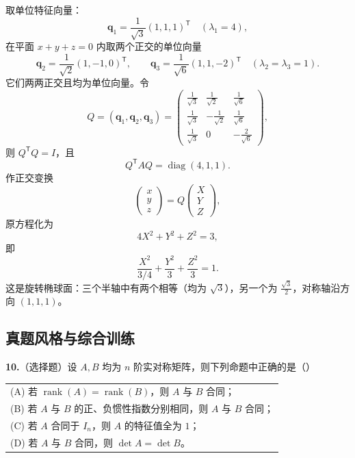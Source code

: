 取单位特征向量：
\[
\mathbf{q}_1=\frac1{\sqrt3}(1,1,1)^{\mathsf T}\quad(\lambda_1=4),
\]
在平面 \(x+y+z=0\) 内取两个正交的单位向量
\[
\mathbf{q}_2=\frac1{\sqrt2}(1,-1,0)^{\mathsf T},\qquad
\mathbf{q}_3=\frac1{\sqrt6}(1,1,-2)^{\mathsf T}
\quad(\lambda_2=\lambda_3=1).
\]
它们两两正交且均为单位向量。令
\[
Q=(\mathbf{q}_1,\mathbf{q}_2,\mathbf{q}_3)
=\begin{pmatrix}
\frac1{\sqrt3}&\frac1{\sqrt2}&\frac1{\sqrt6}\\[2pt]
\frac1{\sqrt3}&-\frac1{\sqrt2}&\frac1{\sqrt6}\\[2pt]
\frac1{\sqrt3}&0&-\frac2{\sqrt6}
\end{pmatrix},
\]
则 \(Q^{\mathsf T}Q=I\)，且
\[
Q^{\mathsf T}AQ=\operatorname{diag}(4,1,1).
\]
作正交变换
\[
\begin{pmatrix}x\\y\\z\end{pmatrix}=Q\begin{pmatrix}X\\Y\\Z\end{pmatrix},
\]
原方程化为
\[
4X^2+Y^2+Z^2=3,
\]
即
\[
\frac{X^2}{3/4}+\frac{Y^2}{3}+\frac{Z^2}{3}=1.
\]
这是旋转椭球面：三个半轴中有两个相等（均为 \(\sqrt3\)），另一个为 \(\frac{\sqrt3}{2}\)，对称轴沿方向 \((1,1,1)\)。

\else \answerarea[12] \fi%

\subsection{真题风格与综合训练}

\textbf{10.}（选择题）设 \(A,B\) 均为 \(n\) 阶实对称矩阵，则下列命题中正确的是（\quad）

\begin{center}
\begin{tabular}{l}
(A) 若 \(\operatorname{rank}(A)=\operatorname{rank}(B)\)，则 \(A\) 与 \(B\) 合同；\\[3pt]
(B) 若 \(A\) 与 \(B\) 的正、负惯性指数分别相同，则 \(A\) 与 \(B\) 合同；\\[3pt]
(C) 若 \(A\) 合同于 \(I_n\)，则 \(A\) 的特征值全为 \(1\)；\\[3pt]
(D) 若 \(A\) 与 \(B\) 合同，则 \(\det A=\det B\)。
\end{tabular}
\end{center}

\ifshowsolutions%

